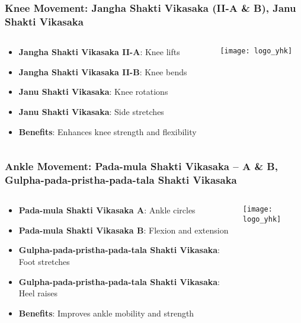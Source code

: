 \begin{frame}[fragile]\frametitle{Knee Movement: Jangha Shakti Vikasaka (II-A \& B), Janu Shakti Vikasaka}
\begin{columns}
    \begin{column}[T]{0.5\linewidth}
      \begin{itemize}
		\item \textbf{Jangha Shakti Vikasaka II-A}: Knee lifts
		\item \textbf{Jangha Shakti Vikasaka II-B}: Knee bends
		\item \textbf{Janu Shakti Vikasaka}: Knee rotations
		\item \textbf{Janu Shakti Vikasaka}: Side stretches
		\item \textbf{Benefits}: Enhances knee strength and flexibility
	  \end{itemize}
    \end{column}
    \begin{column}[T]{0.5\linewidth}
		\begin{center}
		\texttt{[image: logo\_yhk]}
		\end{center}	
    \end{column}
\end{columns}
\end{frame}

\begin{frame}[fragile]\frametitle{Ankle Movement: Pada-mula Shakti Vikasaka – A \& B, Gulpha-pada-pristha-pada-tala Shakti Vikasaka}
\begin{columns}
    \begin{column}[T]{0.5\linewidth}
      \begin{itemize}
		\item \textbf{Pada-mula Shakti Vikasaka A}: Ankle circles
		\item \textbf{Pada-mula Shakti Vikasaka B}: Flexion and extension
		\item \textbf{Gulpha-pada-pristha-pada-tala Shakti Vikasaka}: Foot stretches
		\item \textbf{Gulpha-pada-pristha-pada-tala Shakti Vikasaka}: Heel raises
		\item \textbf{Benefits}: Improves ankle mobility and strength
	  \end{itemize}
    \end{column}
    \begin{column}[T]{0.5\linewidth}
		\begin{center}
		\texttt{[image: logo\_yhk]}
		\end{center}	
    \end{column}
\end{columns}
\end{frame}


